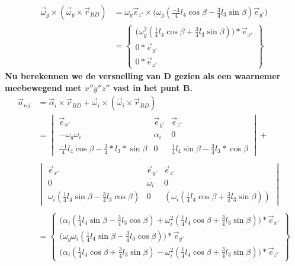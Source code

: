 \documentclass[a4paper,10pt]{article}
\begin{document}
\begin{equation}
	\begin{aligned}
	\vec{\omega}_g \times (\vec{\omega}_g \times \vec{r}_{BD}) &= \omega_g \vec{e}_{z'} \times \Big(\omega_g (\frac{-1}{4} l_4 \cos{\beta}-\frac{3}{4} l_3 \sin{\beta})\vec{e}_{y'}\Big)\\
	& = \begin{Bmatrix}
	\Big(\omega_{g}^{2} (\frac{1}{4} l_4 \cos{\beta}+\frac{3}{4} l_3 \sin{\beta})\Big) * \vec{e}_{x'}\\
	0*\vec{e}_{y'}\\
	0*\vec{e}_{z'}
	\end{Bmatrix}
	\end{aligned}
\end{equation}
\textbf{Nu berekennen we de versnelling van D gezien als een waarnemer meebewegend met $x''y''z''$ vast in het punt B.}
\begin{equation}
	\begin{aligned}
	\vec{a}_{rel} &= \vec{\alpha}_i \times \vec{r}_{BD} + \vec{\omega}_i \times(\vec{\omega}_i \times \vec{r}_{BD})\\
	&= \begin{vmatrix}
	\vec{e}_{x'} & \vec{e}_{y'} & \vec{e}_{z'}\\
	-\omega_g\omega_i & \alpha_i & 0 \\
	\frac{-1}{4} l_4 \cos{\beta} - \frac{3}{4}*l_3 * \sin{\beta} & 0 &\frac{1}{4} l_4 \sin{\beta}-\frac{3}{4} l_3 * \cos{\beta}
	\end{vmatrix} + \\
	\\
	&\begin{vmatrix}
	\vec{e}_{x'} & \vec{e}_{y'} & \vec{e}_{z'}\\
	0 & \omega_i & 0 \\
	\omega_i (\frac{1}{4} l_4 \sin{\beta}-\frac{3}{4} l_3  \cos{\beta}) & 0 &(\omega_i (\frac{1}{4} l_4 \cos{\beta} + \frac{3}{4} l_3  \sin{\beta}))
	\end{vmatrix}\\
	\\
	&= \begin{Bmatrix}
	\Big(\alpha_i(\frac{1}{4} l_4  \sin{\beta}-\frac{3}{4} l_3  \cos{\beta}) + \omega_i^2 (\frac{1}{4} l_4 \cos{\beta} + \frac{3}{4} l_3  \sin{\beta})\Big)*\vec{e}_{x'}\\
	\Big(\omega_g\omega_i(\frac{1}{4} l_4  \sin{\beta}-\frac{3}{4} l_3  \cos{\beta})\Big)*\vec{e}_{y'}\\
	\Big(\alpha_i (\frac{1}{4} l_4 \cos{\beta} + \frac{3}{4} l_3 \sin{\beta}) - \omega_i^2(\frac{1}{4} l_4 \cos{\beta} + \frac{3}{4} l_3  \sin{\beta})\Big)*\vec{e}_{z'}
	\end{Bmatrix}
	\end{aligned}
\end{equation}
\end{document}
